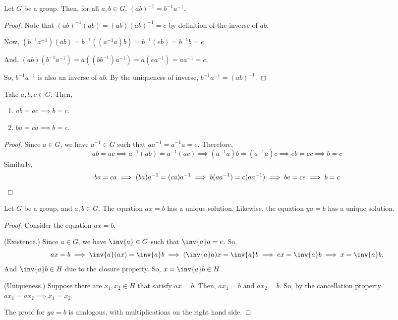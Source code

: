 \documentclass[11pt]{penrose}
\begin{document}
\begin{nthm}
    Let $G$ be a group. Then, for all $a, b \in G$, $(ab)^{-1} = b^{-1} a^{-1}$.
\end{nthm}
\begin{proof}
    Note that $(ab)^{-1} (ab) = (ab) (ab)^{-1} = e$ by definition of the inverse of $ab$.

    Now, $(b^{-1} a^{-1}) (a b) = b^{-1} ((a^{-1} a) b) = b^{-1} (e b) = b^{-1} b = e$.

    And, $(a b) (b^{-1} a^{-1}) = a ((b b^{-1}) a^{-1}) = a (e a^{-1}) = a a^{-1} = e$.

    So, $b^{-1} a^{-1}$ is also an inverse of $ab$. By the uniqueness of inverse, $b^{-1} a^{-1} = (ab)^{-1}$.
\end{proof}

\begin{nthm}
    Take $a, b, c \in G$. Then,
    \begin{enumerate}
        \item $ab = ac \implies b = c$.
        \item $ba = ca \implies b = c$.
    \end{enumerate}
\end{nthm}
\begin{proof}
    Since $a \in G$, we have $a^{-1} \in G$ such that $a a^{-1} = a^{-1} a = e$. Therefore,
    \begin{equation*}
        ab = ac
        \implies a^{-1} (ab) = a^{-1} (ac)
        \implies (a^{-1} a)b = (a^{-1} a)c
        \implies eb = ec
        \implies b = c
    \end{equation*}
    Similarly,
    \begin{equation*}
        ba = ca
        \implies (ba)a^{-1} = (ca)a^{-1}
        \implies b (a a^{-1}) = c (a a^{-1})
        \implies be = ce
        \implies b = c
        \qedhere
    \end{equation*}
\end{proof}

\begin{nthm}
    Let $G$ be a group, and $a, b \in G$. The equation $a x = b$ has a unique solution. Likewise, the equation $y a = b$ has a unique solution.
\end{nthm}
\begin{proof}
    Consider the equation $a x = b$.

    (Existence.) Since $a \in G$, we have $\inv{a} \in G$ such that $\inv{a} a = e$. So,
    \begin{equation*}
        ax = b
        \implies \inv{a} (a x) = \inv{a} b
        \implies (\inv{a} a) x = \inv{a} b
        \implies e x = \inv{a} b
        \implies x = \inv{a} b.
    \end{equation*}
    And $\inv{a} b \in H$ due to the closure property. So, $x = \inv{a} b \in H$.

    (Uniqueness.) Suppose there are $x_1, x_2 \in H$ that satisfy $a x = b$. Then, $a x_1 = b$ and $a x_2 = b$. So, by the cancellation property $a x_1 = a x_2 \implies x_1 = x_2$.
    
    The proof for $y a = b$ is analogous, with multiplications on the right hand side.
\end{proof}
\end{document}
